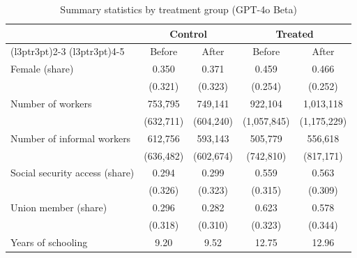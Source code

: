 \begin{table}[H]
  \centering
  \caption{\label{tab:sumstats_exposure_beta_gpt}Summary statistics by treatment group (GPT-4o Beta)}
  \centering
  \begin{threeparttable}
    \begin{tabular}[t]{lcccc}
      \toprule
      \multicolumn{1}{c}{ }          & \multicolumn{2}{c}{Control} & \multicolumn{2}{c}{Treated}                             \\
      \cmidrule(l{3pt}r{3pt}){2-3} \cmidrule(l{3pt}r{3pt}){4-5}
                                     & Before                      & After                       & Before      & After       \\
      \midrule
      Female (share)                 & 0.350                       & 0.371                       & 0.459       & 0.466       \\
                                     & (0.321)                     & (0.323)                     & (0.254)     & (0.252)     \\
      \addlinespace[3pt]
      Number of workers              & 753,795                     & 749,141                     & 922,104     & 1,013,118   \\
                                     & (632,711)                   & (604,240)                   & (1,057,845) & (1,175,229) \\
      \addlinespace[3pt]
      Number of informal workers     & 612,756                     & 593,143                     & 505,779     & 556,618     \\
                                     & (636,482)                   & (602,674)                   & (742,810)   & (817,171)   \\
      \addlinespace[3pt]
      Social security access (share) & 0.294                       & 0.299                       & 0.559       & 0.563       \\
                                     & (0.326)                     & (0.323)                     & (0.315)     & (0.309)     \\
      \addlinespace[3pt]
      Union member (share)           & 0.296                       & 0.282                       & 0.623       & 0.578       \\
                                     & (0.318)                     & (0.310)                     & (0.323)     & (0.344)     \\
      \addlinespace[3pt]
      Years of schooling             & 9.20                        & 9.52                        & 12.75       & 12.96       \\

\end{tabular}
\end{threeparttable}
\end{table}

